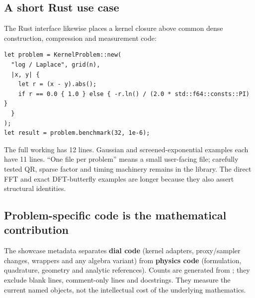 \subsection{A short Rust use case}
The Rust interface likewise places a kernel closure above common dense construction, compression and measurement code:
\begin{lstlisting}
let problem = KernelProblem::new(
  "log / Laplace", grid(n),
  |x, y| {
    let r = (x - y).abs();
    if r == 0.0 { 1.0 } else { -r.ln() / (2.0 * std::f64::consts::PI) }
  }
);
let result = problem.benchmark(32, 1e-6);
\end{lstlisting}
The full working  has 12 lines. Gaussian and screened-exponential examples each have 11 lines. ``One file per problem'' means a small user-facing file; carefully tested QR, sparse factor and timing machinery remains in the library. The direct FFT and exact DFT-butterfly examples are longer because they also assert structural identities.

\subsection{Problem-specific code is the mathematical contribution}
The showcase metadata separates \textbf{dial code} (kernel adapters, proxy/sampler changes, wrappers and any algebra variant) from \textbf{physics code} (formulation, quadrature, geometry and analytic references). Counts are generated from ; they exclude blank lines, comment-only lines and docstrings. They measure the current named objects, not the intellectual cost of the underlying mathematics.

